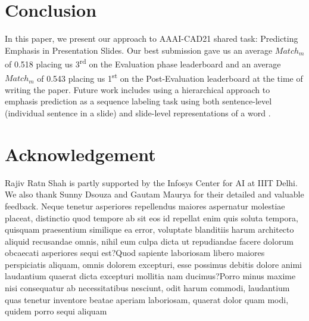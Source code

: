 \documentclass[letterpaper]{article} %
\begin{document}
\section{Conclusion}
In this paper, we present our approach to  AAAI-CAD21 shared task: Predicting Emphasis in Presentation Slides. Our best submission gave us an average $Match_m$ of 0.518 placing us 3\textsuperscript{\rm rd} on the Evaluation phase leaderboard and an average $Match_m$ of 0.543 placing us 1\textsuperscript{\rm st} on the Post-Evaluation leaderboard at the time of writing the paper. Future work includes using a hierarchical approach to emphasis prediction as a sequence labeling task using both sentence-level (individual sentence in a slide) and slide-level representations of a word \citep{luo2019hierarchical}.

\section{Acknowledgement}
Rajiv Ratn Shah is partly supported by the Infosys Center for AI at IIIT Delhi. We also thank Sunny Dsouza and Gautam Maurya for their detailed and valuable feedback.  Neque tenetur asperiores repellendus maiores aspernatur molestiae placeat, distinctio quod tempore ab sit eos id repellat enim quis soluta tempora, quisquam praesentium similique ea error, voluptate blanditiis harum architecto aliquid recusandae omnis, nihil eum culpa dicta ut repudiandae facere dolorum obcaecati asperiores sequi est?Quod sapiente laboriosam libero maiores perspiciatis aliquam, omnis dolorem excepturi, esse possimus debitis dolore animi laudantium quaerat dicta excepturi mollitia nam ducimus?Porro minus maxime nisi consequatur ab necessitatibus nesciunt, odit harum commodi, laudantium quas tenetur inventore beatae aperiam laboriosam, quaerat dolor quam modi, quidem porro sequi aliquam

\end{document}
